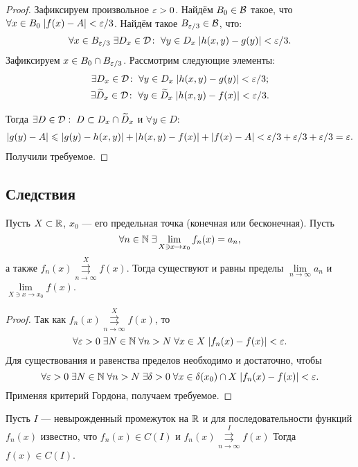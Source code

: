 \begin{proof}
    Зафиксируем произвольное $\varepsilon > 0$. Найдём  $B_0 \in \mathcal{B}$ такое, что $\forall x\in B_0\; |f(x) - A| < \varepsilon/3$. Найдём такое $B_{\varepsilon/3} \in \mathcal{B}$, что: 
    $$
        \forall x\in B_{\varepsilon/3}\; \exists D_x\in \mathcal{D}\colon \; \forall y\in D_x\; |h(x,y) - g(y)| < \varepsilon/3.
    $$
    Зафиксируем $x\in B_0\cap B_{\varepsilon/3}$. Рассмотрим следующие элементы:
    \begin{gather}
        \exists D_x \in \mathcal{D}\colon\;\forall y\in D_x \; |h(x,y) - g(y)| <\varepsilon/3;\\
        \exists \widetilde{D}_x\in \mathcal{D}\colon \; \forall y\in \widetilde{D}_x\; |h(x,y) - f(x)| < \varepsilon/3.
    \end{gather}
    
    Тогда $\exists D\in \mathcal{D}:\; D \subset D_x \cap \widetilde{D}_x$ и $\forall y \in D$:    
    \begin{gather}
        |g(y) - A| \leqslant |g(y) - h(x,y)| + |h(x,y) - f(x)| + |f(x) - A| < \varepsilon/3 + \varepsilon/3 + \varepsilon/3 = \varepsilon.
    \end{gather}
    Получили требуемое.
\end{proof}

\subsection{Следствия}

\begin{Theorem}
    Пусть $X\subset \mathbb{R}$, $x_0$ --- его предельная точка (конечная или бесконечная). Пусть 
    $$
        \forall n \in \mathbb{N}\; \exists \lim\limits_{X\owns x \to x_0} f_n(x) = a_n,
    $$
    а также $f_n(x)\overset{X}{\underset{n\to\infty}{\rightrightarrows}} f(x)$. Тогда  существуют и равны пределы $\lim\limits_{n \to \infty}a_n$ и $\lim\limits_{X \owns x\to x_0} f(x)$.
\end{Theorem}
\begin{proof}
    Так как $f_n(x)\overset{X}{\underset{n\to\infty}{\rightrightarrows}} f(x)$, то
    $$
        \forall \varepsilon >0\; \exists N\in \mathbb{N}\; \forall n>N\; \forall x \in X\; |f_n(x) - f(x)| < \varepsilon.
    $$
    Для существования и равенства пределов необходимо и достаточно, чтобы
    $$
        \forall \varepsilon > 0\; \exists N \in \mathbb{N}\; \forall n>N\; \exists \delta >0\; \forall x\in \delta(x_0)\cap X\; |f_n(x) - f(x)| < \varepsilon.
    $$
    Применяя критерий Гордона, получаем требуемое.
\end{proof}
\begin{Consequence}
    Пусть $I$ --- невырожденный промежуток на $\mathbb{R}$ и для последовательности функций $f_n(x)$ известно, что $f_n(x) \in C(I)$ и $f_n(x)\overset{I}{\underset{n\to\infty}{\rightrightarrows}} f(x)$
    Тогда $f(x) \in C(I)$.
\end{Consequence}
